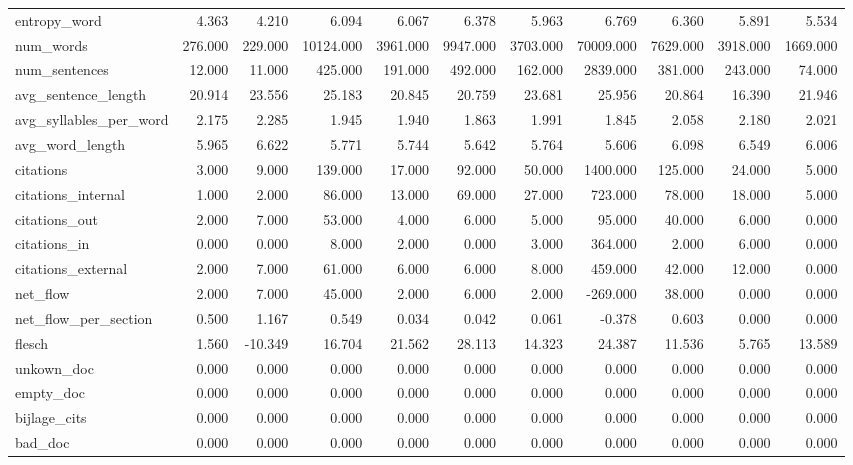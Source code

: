 \begin{tabular}{lrrrrrrrrrr}
\cline{1-11}
entropy\_word & 4.363 & 4.210 & 6.094 & 6.067 & 6.378 & 5.963 & 6.769 & 6.360 & 5.891 & 5.534 \\
\cline{1-11}
num\_words & 276.000 & 229.000 & 10124.000 & 3961.000 & 9947.000 & 3703.000 & 70009.000 & 7629.000 & 3918.000 & 1669.000 \\
\cline{1-11}
num\_sentences & 12.000 & 11.000 & 425.000 & 191.000 & 492.000 & 162.000 & 2839.000 & 381.000 & 243.000 & 74.000 \\
\cline{1-11}
avg\_sentence\_length & 20.914 & 23.556 & 25.183 & 20.845 & 20.759 & 23.681 & 25.956 & 20.864 & 16.390 & 21.946 \\
\cline{1-11}
avg\_syllables\_per\_word & 2.175 & 2.285 & 1.945 & 1.940 & 1.863 & 1.991 & 1.845 & 2.058 & 2.180 & 2.021 \\
\cline{1-11}
avg\_word\_length & 5.965 & 6.622 & 5.771 & 5.744 & 5.642 & 5.764 & 5.606 & 6.098 & 6.549 & 6.006 \\
\cline{1-11}
citations & 3.000 & 9.000 & 139.000 & 17.000 & 92.000 & 50.000 & 1400.000 & 125.000 & 24.000 & 5.000 \\
\cline{1-11}
citations\_internal & 1.000 & 2.000 & 86.000 & 13.000 & 69.000 & 27.000 & 723.000 & 78.000 & 18.000 & 5.000 \\
\cline{1-11}
citations\_out & 2.000 & 7.000 & 53.000 & 4.000 & 6.000 & 5.000 & 95.000 & 40.000 & 6.000 & 0.000 \\
\cline{1-11}
citations\_in & 0.000 & 0.000 & 8.000 & 2.000 & 0.000 & 3.000 & 364.000 & 2.000 & 6.000 & 0.000 \\
\cline{1-11}
citations\_external & 2.000 & 7.000 & 61.000 & 6.000 & 6.000 & 8.000 & 459.000 & 42.000 & 12.000 & 0.000 \\
\cline{1-11}
net\_flow & 2.000 & 7.000 & 45.000 & 2.000 & 6.000 & 2.000 & -269.000 & 38.000 & 0.000 & 0.000 \\
\cline{1-11}
net\_flow\_per\_section & 0.500 & 1.167 & 0.549 & 0.034 & 0.042 & 0.061 & -0.378 & 0.603 & 0.000 & 0.000 \\
\cline{1-11}
flesch & 1.560 & -10.349 & 16.704 & 21.562 & 28.113 & 14.323 & 24.387 & 11.536 & 5.765 & 13.589 \\
\cline{1-11}
unkown\_doc & 0.000 & 0.000 & 0.000 & 0.000 & 0.000 & 0.000 & 0.000 & 0.000 & 0.000 & 0.000 \\
\cline{1-11}
empty\_doc & 0.000 & 0.000 & 0.000 & 0.000 & 0.000 & 0.000 & 0.000 & 0.000 & 0.000 & 0.000 \\
\cline{1-11}
bijlage\_cits & 0.000 & 0.000 & 0.000 & 0.000 & 0.000 & 0.000 & 0.000 & 0.000 & 0.000 & 0.000 \\
\cline{1-11}
bad\_doc & 0.000 & 0.000 & 0.000 & 0.000 & 0.000 & 0.000 & 0.000 & 0.000 & 0.000 & 0.000 \\
\cline{1-11}
\bottomrule
\end{tabular}
